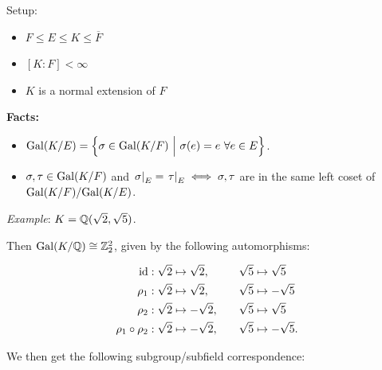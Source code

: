 Setup:

\begin{itemize}
\item
  \(F \leq E \leq K \leq \overline F\)
\item
  \([K: F] < \infty\)
\item
  \(K\) is a normal extension of \(F\)
\end{itemize}

\textbf{Facts:}

\begin{itemize}
\item
  \(\mathrm{Gal}(K/E) = \left\{{\sigma \in \mathrm{Gal}(K/F) {~\mathrel{\Big|}~} \sigma(e) = e ~\forall e\in E}\right\}\).
\item
  \(\sigma, \tau \in \mathrm{Gal}(K/F)\) and
  \({\left.{\sigma}\right|_{E}} = {\left.{\tau}\right|_{E}} \iff \sigma, \tau\)
  are in the same left coset of \(\mathrm{Gal}(K/F) / \mathrm{Gal}(K/E)\).
\end{itemize}

\emph{Example}: \(K = {\mathbb{Q}}(\sqrt 2, \sqrt 5)\).

Then \(\mathrm{Gal}(K/{\mathbb{Q}}) \cong {\mathbb{Z}}_2^2\), given by the following
automorphisms:

\begin{align*}
\text{id}:     \sqrt 2 &\mapsto \sqrt 2,  \quad& \sqrt 5 &\mapsto \sqrt 5 \\
\rho_1:  \sqrt 2 &\mapsto \sqrt 2,  \quad& \sqrt 5 &\mapsto -\sqrt 5 \\
\rho_2:  \sqrt 2 &\mapsto -\sqrt 2, \quad& \sqrt 5 &\mapsto \sqrt 5 \\
\rho_1 \circ \rho_2:  \sqrt 2 &\mapsto -\sqrt 2, \quad& \sqrt 5 &\mapsto -\sqrt 5
.\end{align*}

We then get the following subgroup/subfield correspondence:

